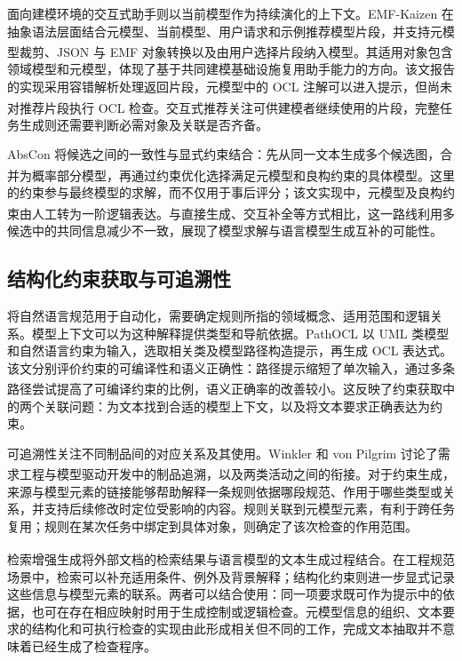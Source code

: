 \documentclass[pdflatex,iicol,sn-mathphys-num]{sn-jnl}
\newcommand{\paperref}[1]{\textsuperscript{\textcolor{citationred}{\citep{#1}}}}
\begin{document}
面向建模环境的交互式助手则以当前模型作为持续演化的上下文。EMF-Kaizen 在抽象语法层面结合元模型、当前模型、用户请求和示例推荐模型片段，并支持元模型裁剪、JSON 与 EMF 对象转换以及由用户选择片段纳入模型\paperref{JOT:issue_2026_03/a8}。其适用对象包含领域模型和元模型，体现了基于共同建模基础设施复用助手能力的方向。该文报告的实现采用容错解析处理返回片段，元模型中的 OCL 注解可以进入提示，但尚未对推荐片段执行 OCL 检查\paperref{JOT:issue_2026_03/a8}。交互式推荐关注可供建模者继续使用的片段，完整任务生成则还需要判断必需对象及关联是否齐备。


AbsCon 将候选之间的一致性与显式约束结合：先从同一文本生成多个候选图，合并为概率部分模型，再通过约束优化选择满足元模型和良构约束的具体模型\paperref{Chen_2025}。这里的约束参与最终模型的求解，而不仅用于事后评分；该文实现中，元模型及良构约束由人工转为一阶逻辑表达\paperref{Chen_2025}。与直接生成、交互补全等方式相比，这一路线利用多候选中的共同信息减少不一致，展现了模型求解与语言模型生成互补的可能性。


\subsection{结构化约束获取与可追溯性}\label{sec:related-2-3}

将自然语言规范用于自动化，需要确定规则所指的领域概念、适用范围和逻辑关系。模型上下文可以为这种解释提供类型和导航依据。PathOCL 以 UML 类模型和自然语言约束为输入，选取相关类及模型路径构造提示，再生成 OCL 表达式。该文分别评价约束的可编译性和语义正确性：路径提示缩短了单次输入，通过多条路径尝试提高了可编译约束的比例，语义正确率的改善较小\paperref{Abukhalaf_2024}。这反映了约束获取中的两个关联问题：为文本找到合适的模型上下文，以及将文本要求正确表达为约束。


可追溯性关注不同制品间的对应关系及其使用。Winkler 和 von Pilgrim 讨论了需求工程与模型驱动开发中的制品追溯，以及两类活动之间的衔接\paperref{Winkler2010}。对于约束生成，来源与模型元素的链接能够帮助解释一条规则依据哪段规范、作用于哪些类型或关系，并支持后续修改时定位受影响的内容。规则关联到元模型元素，有利于跨任务复用；规则在某次任务中绑定到具体对象，则确定了该次检查的作用范围。


检索增强生成将外部文档的检索结果与语言模型的文本生成过程结合\paperref{NEURIPS2020_6b493230}。在工程规范场景中，检索可以补充适用条件、例外及背景解释；结构化约束则进一步显式记录这些信息与模型元素的联系。两者可以结合使用：同一项要求既可作为提示中的依据，也可在存在相应映射时用于生成控制或逻辑检查。元模型信息的组织、文本要求的结构化和可执行检查的实现由此形成相关但不同的工作，完成文本抽取并不意味着已经生成了检查程序。
\end{document}

